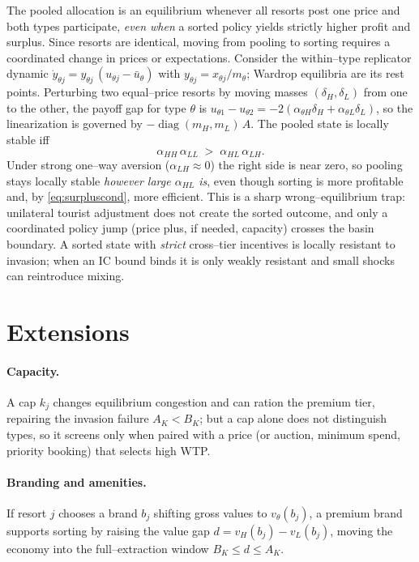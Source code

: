 \documentclass[11pt]{article}
\theoremstyle{plain}
\theoremstyle{definition}
\theoremstyle{remark}
\newcommand{\mH}{m_{H}}
\newcommand{\mL}{m_{L}}
\newcommand{\vH}{v_{H}}
\newcommand{\vL}{v_{L}}
\newcommand{\aHH}{\alpha_{HH}}
\newcommand{\aHL}{\alpha_{HL}}
\newcommand{\aLH}{\alpha_{LH}}
\newcommand{\aLL}{\alpha_{LL}}
\begin{document}
The pooled allocation is an equilibrium whenever all resorts post one price and both types
participate, \emph{even when} a sorted policy yields strictly higher profit and surplus. Since
resorts are identical, moving from pooling to sorting requires a coordinated change in prices or
expectations. Consider the within--type replicator dynamic
$\dot y_{\theta j}=y_{\theta j}\,(u_{\theta j}-\bar u_\theta)$ with $y_{\theta j}=x_{\theta j}/m_\theta$;
Wardrop equilibria are its rest points. Perturbing two equal--price resorts by moving masses
$(\delta_H,\delta_L)$ from one to the other, the payoff gap for type $\theta$ is
$u_{\theta 1}-u_{\theta 2}=-2(\alpha_{\theta H}\delta_H+\alpha_{\theta L}\delta_L)$, so the
linearization is governed by $-\operatorname{diag}(\mH,\mL)\,A$. The pooled state is locally
stable iff
\begin{equation}
\boxed{\ \aHH\,\aLL \;>\; \aHL\,\aLH. \ }
\label{eq:stability}
\end{equation}
Under strong one--way aversion ($\aLH\approx0$) the right side is near zero, so pooling stays
locally stable \emph{however large $\aHL$ is}, even though sorting is more profitable and, by
\eqref{eq:surpluscond}, more efficient. This is a sharp wrong--equilibrium trap: unilateral
tourist adjustment does not create the sorted outcome, and only a coordinated policy jump (price
plus, if needed, capacity) crosses the basin boundary. A sorted state with \emph{strict}
cross--tier incentives is locally resistant to invasion; when an IC bound binds it is only
weakly resistant and small shocks can reintroduce mixing.

\section{Extensions}\label{sec:ext}

\paragraph{Capacity.}
A cap $k_j$ changes equilibrium congestion and can ration the premium tier, repairing the
invasion failure $A_K<B_K$; but a cap alone does not distinguish types, so it screens only when
paired with a price (or auction, minimum spend, priority booking) that selects high WTP.

\paragraph{Branding and amenities.}
If resort $j$ chooses a brand $b_j$ shifting gross values to $v_\theta(b_j)$, a premium brand
supports sorting by raising the value gap $d=\vH(b_j)-\vL(b_j)$, moving the economy into the
full--extraction window $B_K\le d\le A_K$.
\end{document}
